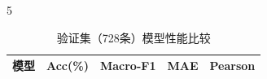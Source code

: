 \begin{PaperTable}{5}

\begin{table}[!htbp]
\centering\caption{验证集（728条）模型性能比较\label{q3-tab4}}
\begin{tabular}{@{}lllll@{}}
\toprule
\begin{minipage}[b]{\dimexpr 0.340000\linewidth-2.720000\tabcolsep\relax}\raggedright
模型\strut
\end{minipage} & \begin{minipage}[b]{\dimexpr 0.160000\linewidth-1.280000\tabcolsep\relax}\raggedleft
Acc(\%)\strut
\end{minipage} & \begin{minipage}[b]{\dimexpr 0.180000\linewidth-1.440000\tabcolsep\relax}\raggedleft
Macro-F1\strut
\end{minipage} & \begin{minipage}[b]{\dimexpr 0.160000\linewidth-1.280000\tabcolsep\relax}\raggedleft
MAE\strut
\end{minipage} & \begin{minipage}[b]{\dimexpr 0.160000\linewidth-1.280000\tabcolsep\relax}\raggedleft
Pearson\strut
\end{minipage}\tabularnewline
\midrule


\end{tabular}
\end{table}
\end{PaperTable}
